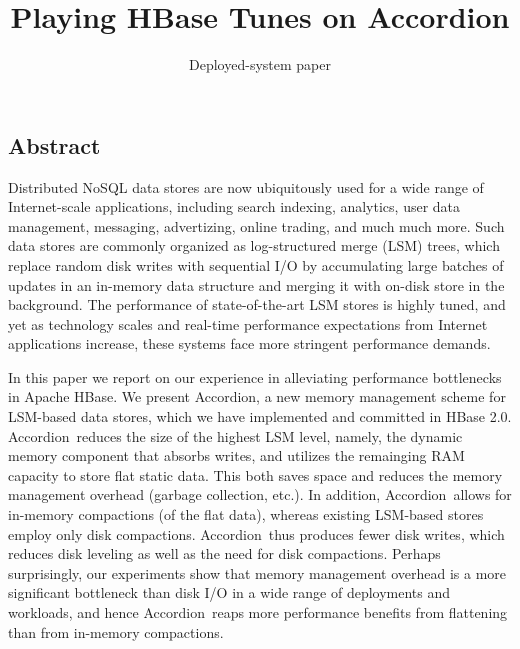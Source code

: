 \documentclass[letterpaper,twocolumn,10pt]{article}
\newcommand{\remove}[1]{}
\newcommand{\tb}{\hspace{5mm}}
\newcommand{\sys}{Accordion}
\begin{document}
\date{}

\title{\Large \bf  Playing HBase Tunes on \sys}


\author{
\remove{
Edward Bortnikov\footnotemark[1]  \tb
Anastasia Braginsky\footnotemark[1]  \tb
Eshcar Hillel\footnotemark[1] \tb 
Idit Keidar\footnotemark[1] \footnotemark[2] \\
	\footnotemark[1] Yahoo Research\ \ \footnotemark[2] Technion  \\ [2mm]
}
Deployed-system paper
} %


\maketitle




\subsection*{Abstract}

Distributed NoSQL data stores are now ubiquitously used for a wide range of Internet-scale applications, 
including search indexing, analytics, user data management, messaging, advertizing, online trading, and much much more.
Such data stores are commonly organized as  log-structured merge (LSM) trees, 
which replace random disk writes with sequential I/O by accumulating large batches of updates 
in an in-memory data structure and merging it with  on-disk store in the background. 
The performance of state-of-the-art LSM stores is highly tuned, and yet as technology scales 
and real-time performance expectations from Internet applications increase, these systems face more stringent performance demands.

In this paper we report on our experience in  alleviating performance bottlenecks in Apache HBase. 
We present \sys, a new memory management scheme for LSM-based data stores, which we have implemented and committed in HBase 2.0.
\sys\ reduces the size of the highest LSM level, namely, the dynamic memory component that absorbs writes, and utilizes the remainging 
RAM capacity to store flat static data. This both saves space and reduces the memory management overhead (garbage collection, etc.). 
In addition, \sys\ allows for in-memory compactions (of the flat data), whereas existing LSM-based stores employ only disk compactions. 
\sys\ thus produces  fewer disk writes, which reduces disk leveling as well as the need for disk compactions. 
Perhaps surprisingly, our experiments show that memory management overhead is a more significant bottleneck than disk I/O in a
wide range of deployments and workloads, and hence \sys\ reaps more performance benefits from flattening than from in-memory compactions.
\end{document}
